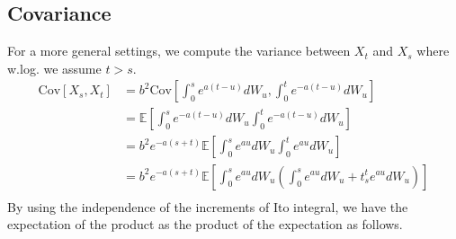 \documentclass[a4paper,12pt]{article} %
\newcommand{\Cov}{\mathrm{Cov}}
\begin{document}
\subsection{Covariance}
For a more general settings, we compute the variance between \(X_t\) and \(X_s\) where w.log. we assume \(t>s\).
\begin{align*}
    \Cov\left[X_s, X_t \right] & = b^2\Cov\left[\int _0^{s} e^{a(t-u)}dW_u,\int _0^t e^{-a(t-u)}dW_u   \right]                                                  \\
                               & = \mathbb{E} \left[  \int _0^{s} e^{-a(t-u)}dW_u\int _0^t e^{-a(t-u)}dW_u \right]                                              \\
                               & = b^2 e^{-a(s+t)} \mathbb{E} \left[   \int _0^{s} e^{au}dW_u\int _0^t e^{au}dW_u  \right]                                      \\
                               & =b^2 e^{-a(s+t)} \mathbb{E} \left[   \int _0^{s} e^{au}dW_u \left(  \int _0^s e^{au}dW_u  + t _s^t e^{au}dW_u   \right)\right] \\
\end{align*}
By using the independence of the increments of Ito integral, we have the expectation of the product as the product of the expectation as follows.
\end{document}
